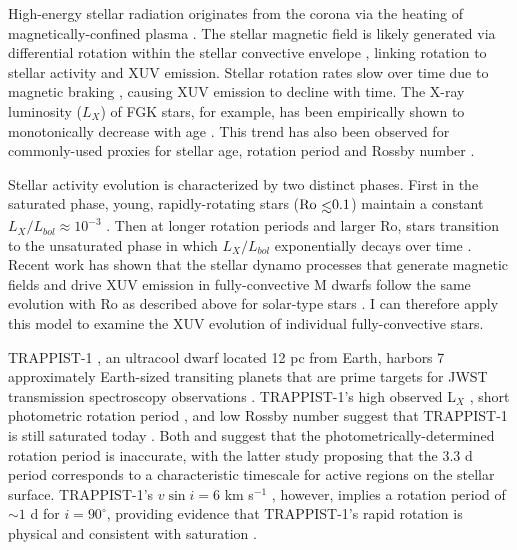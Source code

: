 High-energy stellar radiation originates from the corona via the heating of magnetically-confined plasma \citep{Vaiana1981}. The stellar magnetic field is likely generated via differential rotation within the stellar convective envelope \citep{Parker1955}, linking rotation to stellar activity and XUV emission. Stellar rotation rates slow over time due to magnetic braking \citep{Skumanich1972}, causing XUV emission to decline with time. The X-ray luminosity ($L_{X}$) of FGK stars, for example, has been empirically shown to monotonically decrease with age \citep{Jackson2012}. This trend has also been observed for commonly-used proxies for stellar age, rotation period and Rossby number \citep[Ro = $P_{rot}/\tau$ for convective turnover timescale $\tau$,][]{Pizzolato2003,Wright2011}. 

Stellar activity evolution is characterized by two distinct phases. First in the saturated phase, young, rapidly-rotating stars ($\mathrm{Ro}\lsim 0.1$) maintain a constant $L_{X}/L_{bol} \approx 10^{-3}$ \citep{Wright2011,Jackson2012}. Then at longer rotation periods and larger Ro, stars transition to the unsaturated phase in which $L_{X}/L_{bol}$ exponentially decays over time \citep{Pizzolato2003,Ribas2005}. Recent work has shown that the stellar dynamo processes that generate magnetic fields and drive XUV emission in fully-convective M dwarfs follow the same evolution with Ro as described above for solar-type stars \citep{Wright2016,Wright2018}. I can therefore apply this model to examine the XUV evolution of individual fully-convective stars.

TRAPPIST-1 \citep{Gillon2016,Gillon2017}, an ultracool dwarf located 12 pc from Earth, harbors 7 approximately Earth-sized transiting planets that are prime targets for JWST transmission spectroscopy observations \citep{Morley2017,Lincowski2018,Lustig2019}. TRAPPIST-1's high observed L$_{X}$ \citep{Wheatley2017}, short photometric rotation period \citep[3.3 d, ][]{Luger2017}, and low Rossby number \citep[Ro $\approx 0.01$, ][]{Roettenbacher2017} suggest that TRAPPIST-1 is still saturated today \citep{Pizzolato2003,Wright2011,Wright2018}. Both \citet{Roettenbacher2017} and \citet{Morris2018} suggest that the photometrically-determined rotation period is inaccurate, with the latter study proposing that the 3.3 d period corresponds to a characteristic timescale for active regions on the stellar surface. TRAPPIST-1's $v \sin i = 6$ km s$^{-1}$ \citep{Barnes2014}, however, implies a rotation period of ${\sim}1$ d for $i = 90^{\circ}$, providing evidence that TRAPPIST-1's rapid rotation is physical and consistent with saturation \citep[$P_{rot} \lsim 20$ d,][]{Wright2018}. 

